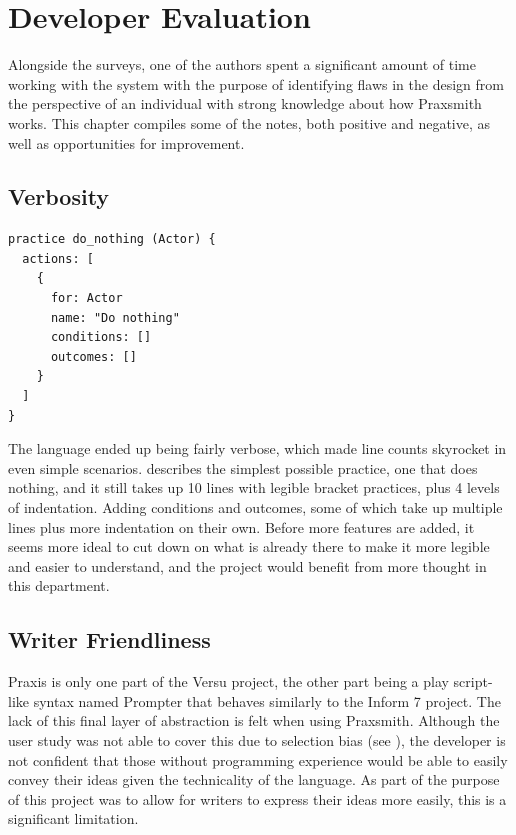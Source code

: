 \chapter{Developer Evaluation} \label{sec:DeveloperEvaluation}

Alongside the surveys, one of the authors spent a significant amount of time working
with the system with the purpose of identifying flaws in the design from the
perspective of an individual with strong knowledge about how Praxsmith works. This
chapter compiles some of the notes, both positive and negative, as well as opportunities
for improvement.

\section{Verbosity} \label{sec:Verbosity}

\begin{lstlisting}[float=hb, caption=A simple Do Nothing practice., label=lst:DoNothingPractice]
practice do_nothing (Actor) {
  actions: [
    {
      for: Actor
      name: "Do nothing"
      conditions: []
      outcomes: []
    }
  ]
}
\end{lstlisting}

The language ended up being fairly verbose, which made line counts skyrocket in even
simple scenarios.  describes the simplest possible practice,
one that does nothing, and it still takes up 10 lines with legible bracket practices,
plus 4 levels of indentation. Adding conditions and outcomes, some of which take up
multiple lines plus more indentation on their own. Before more features are added,
it seems more ideal to cut down on what is already there to make it more legible and
easier to understand, and the project would benefit from more thought in this
department.

\section{Writer Friendliness} \label{sec:WriterFriendliness}

Praxis is only one part of the Versu project, the other part being a play script-like
syntax named Prompter that behaves similarly to the Inform 7 project.
\cite{nelson_prompter_2014} \cite{inform_7_inform_nodate} The lack of
this final layer of abstraction is felt when using Praxsmith. Although the user study
was not able to cover this due to selection bias (see ), the
developer is not confident that those without programming experience would be able to
easily convey their ideas given the technicality of the language. As part of the
purpose of this project was to allow for writers to express their ideas more easily,
this is a significant limitation.

